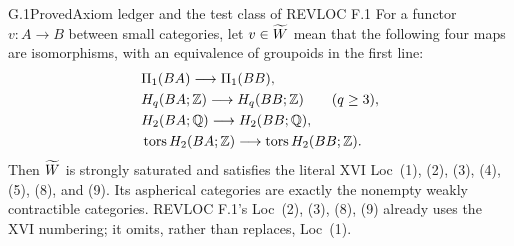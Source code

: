 \begin{claim}{G.1}{Proved}{Axiom ledger and the test class of REVLOC F.1}
\label{G:Wt-axioms}
For a functor $v:A\to B$ between small categories, let $v\in\widetilde W$ mean
that the following four maps are isomorphisms, with an equivalence of
groupoids in the first line:
\begin{align*}
 &\Pi_1(BA)\longrightarrow\Pi_1(BB),\\
 &H_q(BA;\mathbb Z)\longrightarrow H_q(BB;\mathbb Z)\qquad(q\geq3),\\
 &H_2(BA;\mathbb Q)\longrightarrow H_2(BB;\mathbb Q),\\
 &\operatorname{tors} H_2(BA;\mathbb Z)\longrightarrow\operatorname{tors} H_2(BB;\mathbb Z).
\end{align*}
Then $\widetilde W$ is strongly saturated and satisfies the literal XVI
Loc~(1), (2), (3), (4), (5), (8), and (9).  Its aspherical categories
are exactly the nonempty weakly contractible categories.  REVLOC F.1's
Loc~(2), (3), (8), (9) already uses the XVI numbering; it omits, rather
than replaces, Loc~(1).
\end{claim}
